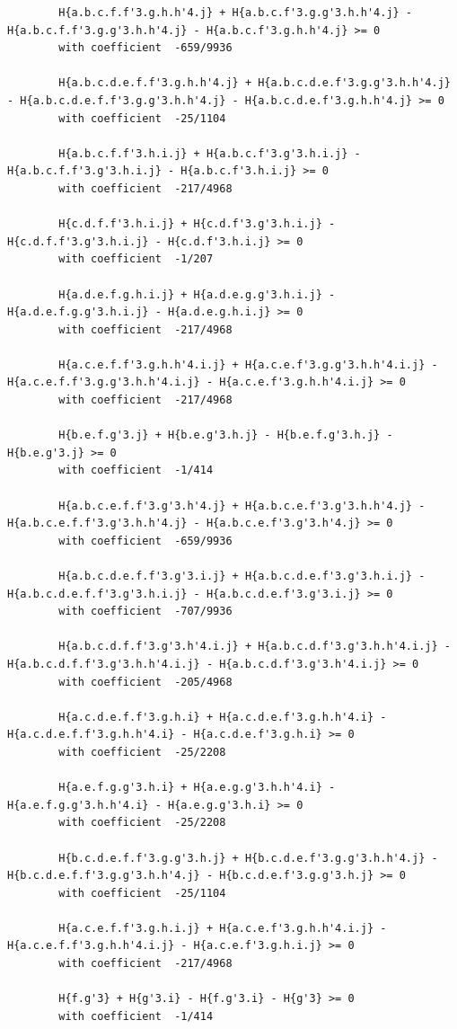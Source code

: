\documentclass[11pt, a4paper]{kybernetika}
\begin{document}
\begin{verbatim}
		H{a.b.c.f.f'3.g.h.h'4.j} + H{a.b.c.f'3.g.g'3.h.h'4.j} - H{a.b.c.f.f'3.g.g'3.h.h'4.j} - H{a.b.c.f'3.g.h.h'4.j} >= 0
		with coefficient  -659/9936
		
		H{a.b.c.d.e.f.f'3.g.h.h'4.j} + H{a.b.c.d.e.f'3.g.g'3.h.h'4.j} - H{a.b.c.d.e.f.f'3.g.g'3.h.h'4.j} - H{a.b.c.d.e.f'3.g.h.h'4.j} >= 0
		with coefficient  -25/1104
		
		H{a.b.c.f.f'3.h.i.j} + H{a.b.c.f'3.g'3.h.i.j} - H{a.b.c.f.f'3.g'3.h.i.j} - H{a.b.c.f'3.h.i.j} >= 0
		with coefficient  -217/4968
		
		H{c.d.f.f'3.h.i.j} + H{c.d.f'3.g'3.h.i.j} - H{c.d.f.f'3.g'3.h.i.j} - H{c.d.f'3.h.i.j} >= 0
		with coefficient  -1/207
		
		H{a.d.e.f.g.h.i.j} + H{a.d.e.g.g'3.h.i.j} - H{a.d.e.f.g.g'3.h.i.j} - H{a.d.e.g.h.i.j} >= 0
		with coefficient  -217/4968
		
		H{a.c.e.f.f'3.g.h.h'4.i.j} + H{a.c.e.f'3.g.g'3.h.h'4.i.j} - H{a.c.e.f.f'3.g.g'3.h.h'4.i.j} - H{a.c.e.f'3.g.h.h'4.i.j} >= 0
		with coefficient  -217/4968
		
		H{b.e.f.g'3.j} + H{b.e.g'3.h.j} - H{b.e.f.g'3.h.j} - H{b.e.g'3.j} >= 0
		with coefficient  -1/414
		
		H{a.b.c.e.f.f'3.g'3.h'4.j} + H{a.b.c.e.f'3.g'3.h.h'4.j} - H{a.b.c.e.f.f'3.g'3.h.h'4.j} - H{a.b.c.e.f'3.g'3.h'4.j} >= 0
		with coefficient  -659/9936
		
		H{a.b.c.d.e.f.f'3.g'3.i.j} + H{a.b.c.d.e.f'3.g'3.h.i.j} - H{a.b.c.d.e.f.f'3.g'3.h.i.j} - H{a.b.c.d.e.f'3.g'3.i.j} >= 0
		with coefficient  -707/9936
		
		H{a.b.c.d.f.f'3.g'3.h'4.i.j} + H{a.b.c.d.f'3.g'3.h.h'4.i.j} - H{a.b.c.d.f.f'3.g'3.h.h'4.i.j} - H{a.b.c.d.f'3.g'3.h'4.i.j} >= 0
		with coefficient  -205/4968
		
		H{a.c.d.e.f.f'3.g.h.i} + H{a.c.d.e.f'3.g.h.h'4.i} - H{a.c.d.e.f.f'3.g.h.h'4.i} - H{a.c.d.e.f'3.g.h.i} >= 0
		with coefficient  -25/2208
		
		H{a.e.f.g.g'3.h.i} + H{a.e.g.g'3.h.h'4.i} - H{a.e.f.g.g'3.h.h'4.i} - H{a.e.g.g'3.h.i} >= 0
		with coefficient  -25/2208
		
		H{b.c.d.e.f.f'3.g.g'3.h.j} + H{b.c.d.e.f'3.g.g'3.h.h'4.j} - H{b.c.d.e.f.f'3.g.g'3.h.h'4.j} - H{b.c.d.e.f'3.g.g'3.h.j} >= 0
		with coefficient  -25/1104
		
		H{a.c.e.f.f'3.g.h.i.j} + H{a.c.e.f'3.g.h.h'4.i.j} - H{a.c.e.f.f'3.g.h.h'4.i.j} - H{a.c.e.f'3.g.h.i.j} >= 0
		with coefficient  -217/4968
		
		H{f.g'3} + H{g'3.i} - H{f.g'3.i} - H{g'3} >= 0
		with coefficient  -1/414
		

\end{verbatim}
\end{document}
